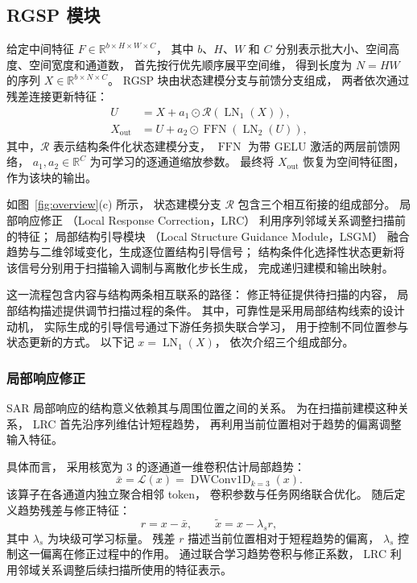\documentclass[journal]{IEEEtran}
\begin{document}
\subsection{RGSP 模块}
\label{sec:rgsp}

给定中间特征
$F\in\mathbb{R}^{b\times H\times W\times C}$，
其中 $b$、$H$、$W$ 和 $C$
分别表示批大小、空间高度、空间宽度和通道数，
首先按行优先顺序展平空间维，
得到长度为 $N=HW$ 的序列
$X\in\mathbb{R}^{b\times N\times C}$。
RGSP 块由状态建模分支与前馈分支组成，
两者依次通过残差连接更新特征：
\begin{equation}
\begin{aligned}
U
&=
X+a_1\odot
\mathcal{R}\left(\operatorname{LN}_1(X)\right),
\\
X_{\mathrm{out}}
&=
U+a_2\odot
\operatorname{FFN}\left(\operatorname{LN}_2(U)\right),
\end{aligned}
\label{eq:rgsp_block}
\end{equation}
其中，$\mathcal{R}$ 表示结构条件化状态建模分支，
$\operatorname{FFN}$ 为带 GELU 激活的两层前馈网络，
$a_1,a_2\in\mathbb{R}^{C}$
为可学习的逐通道缩放参数。
最终将 $X_{\mathrm{out}}$ 恢复为空间特征图，
作为该块的输出。

如图~\ref{fig:overview}(c) 所示，
状态建模分支 $\mathcal{R}$ 包含三个相互衔接的组成部分。
局部响应修正
（Local Response Correction，LRC）
利用序列邻域关系调整扫描前的特征；
局部结构引导模块
（Local Structure Guidance Module，LSGM）
融合趋势与二维邻域变化，生成逐位置结构引导信号；
结构条件化选择性状态更新将该信号分别用于扫描输入调制与离散化步长生成，
完成递归建模和输出映射。

这一流程包含内容与结构两条相互联系的路径：
修正特征提供待扫描的内容，
局部结构描述提供调节扫描过程的条件。
其中，可靠性是采用局部结构线索的设计动机，
实际生成的引导信号通过下游任务损失联合学习，
用于控制不同位置参与状态更新的方式。
以下记
$x=\operatorname{LN}_1(X)$，
依次介绍三个组成部分。


\subsubsection{局部响应修正}
\label{sec:lrc}

SAR 局部响应的结构意义依赖其与周围位置之间的关系。
为在扫描前建模这种关系，
LRC 首先沿序列维估计短程趋势，
再利用当前位置相对于趋势的偏离调整输入特征。

具体而言，
采用核宽为 $3$ 的逐通道一维卷积估计局部趋势：
\begin{equation}
\bar{x}
=
\mathcal{L}(x)
=
\operatorname{DWConv1D}_{k=3}(x).
\label{eq:local_trend}
\end{equation}
该算子在各通道内独立聚合相邻 token，
卷积参数与任务网络联合优化。
随后定义趋势残差与修正特征：
\begin{equation}
r=x-\bar{x},
\qquad
\tilde{x}=x-\lambda_s r,
\label{eq:residual}
\end{equation}
其中 $\lambda_s$ 为块级可学习标量。
残差 $r$ 描述当前位置相对于短程趋势的偏离，
$\lambda_s$ 控制这一偏离在修正过程中的作用。
通过联合学习趋势卷积与修正系数，
LRC 利用邻域关系调整后续扫描所使用的特征表示。
\end{document}
